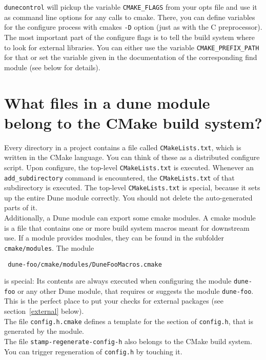 \documentclass[a4paper,10pt]{scrartcl}
\begin{document}
\lstinline!dunecontrol! will pickup the variable \lstinline!CMAKE_FLAGS! from your opts file and use it as command line options for any calls to cmake. There, you can define variables for the configure process with cmakes \lstinline!-D! option (just as with the C preprocessor). \\

The most important part of the configure flags is to tell the build system where to look for external libraries. You can either use the variable \lstinline!CMAKE_PREFIX_PATH! for that or set the variable given in the documentation of the corresponding find module (see below for details).

\section{What files in a dune module belong to the CMake build system?}
\label{files}
Every directory in a project contains a file called \lstinline!CMakeLists.txt!, which is written in the CMake language. You can think of these as a distributed configure script. Upon configure, the top-level \lstinline!CMakeLists.txt! is executed. Whenever an \lstinline!add_subdirectory! command is encountered, the \lstinline!CMakeLists.txt! of that subdirectory is executed. The top-level \lstinline!CMakeLists.txt! is special, because it sets up the entire Dune module correctly. You should not delete the auto-generated parts of it. \\

Additionally, a Dune module can export some cmake modules. A cmake module is a file that contains one or more build system macros meant for downstream use. If a module provides modules, they can be found in the subfolder \lstinline!cmake/modules!. The module
\begin{lstlisting}
 dune-foo/cmake/modules/DuneFooMacros.cmake
\end{lstlisting}
is special: Its contents are always executed when configuring the module \lstinline!dune-foo! or any other Dune module, that requires or suggests the module \lstinline!dune-foo!. This is the perfect place to put your checks for external packages (see section~\ref{external} below). \\

The file \lstinline!config.h.cmake! defines a template for the section of \lstinline!config.h!, that is generated by the module. \\

The file \lstinline!stamp-regenerate-config-h! also belongs to the CMake build system. You can trigger regeneration of \lstinline!config.h! by touching it.
\end{document}
